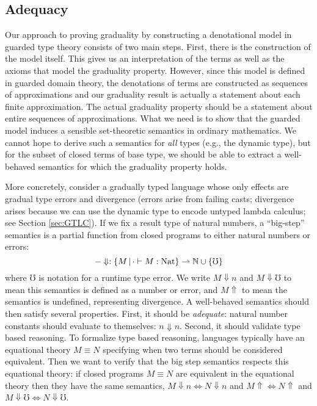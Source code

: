 

\subsection{Adequacy}

Our approach to proving graduality by constructing a denotational model in
guarded type theory consists of two main steps. First, there is the construction
of the model itself. This gives us an interpretation of the terms as well as the
axioms that model the graduality property. However, since this model is defined
in guarded domain theory, the denotations of terms are constructed as sequences of
approximations and our graduality result is actually a statement about each
finite approximation. The actual graduality property should be a statement about
entire sequences of approximations.
%
What we need is to show that the guarded model induces a sensible set-theoretic
semantics in ordinary mathematics. We cannot hope to derive such a semantics for
\emph{all} types (e.g., the dynamic type), but for the subset of closed terms of
base type, we should be able to extract a well-behaved semantics for which the
graduality property holds.

More concretely, consider a gradually typed language whose only effects are
gradual type errors and divergence (errors arise from failing casts; divergence
arises because we can use the dynamic type to encode untyped lambda calculus;
see Section \ref{sec:GTLC}). If we fix a result type of natural numbers, a
``big-step'' semantics is a partial function from closed programs to either natural
numbers or errors:
%
\[ -\Downarrow : \{M \,|\, \cdot \vdash M : \text{Nat} \} \rightharpoonup \mathbb{N}
\cup \{\mho\} \] 
%
where $\mho$ is notation for a runtime type error. We write $M \Downarrow n$ and
$M\Downarrow \mho$ to mean this semantics is defined as a number or error, and
$M\Uparrow$ to mean the semantics is undefined, representing divergence.
%
A well-behaved semantics should then satisfy several properties. First, it
should be \emph{adequate}: natural number constants should evaluate to
themselves: $n \Downarrow n$. Second, it should validate type based reasoning.
To formalize type based reasoning, languages typically have an equational theory
$M \equiv N$ specifying when two terms should be considered equivalent.
Then we want to verify that the big step semantics respects this equational
theory: if closed programs $M \equiv N$ are equivalent in the equational theory
then they have the same semantics, $M \Downarrow n \iff N \Downarrow n$ and
$M\Uparrow \iff N \Uparrow$ and $M \Downarrow \mho \iff N \Downarrow \mho$.

